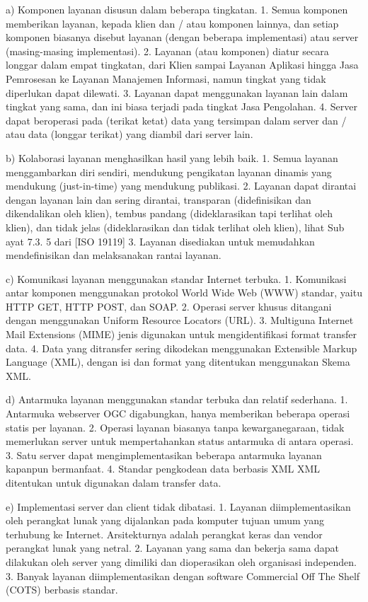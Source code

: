 a) Komponen layanan disusun dalam beberapa tingkatan.
1. Semua komponen memberikan layanan, kepada klien dan / atau komponen lainnya, dan setiap komponen biasanya disebut layanan (dengan beberapa implementasi) atau server (masing-masing implementasi).
2. Layanan (atau komponen) diatur secara longgar dalam empat tingkatan, dari Klien sampai Layanan Aplikasi hingga Jasa Pemrosesan ke Layanan Manajemen Informasi, namun tingkat yang tidak diperlukan dapat dilewati.
3. Layanan dapat menggunakan layanan lain dalam tingkat yang sama, dan ini biasa terjadi pada tingkat Jasa Pengolahan.
4. Server dapat beroperasi pada (terikat ketat) data yang tersimpan dalam server dan / atau data (longgar terikat) yang diambil dari server lain.

b) Kolaborasi layanan menghasilkan hasil yang lebih baik.
1. Semua layanan menggambarkan diri sendiri, mendukung pengikatan layanan dinamis yang mendukung (just-in-time) yang mendukung publikasi.
2. Layanan dapat dirantai dengan layanan lain dan sering dirantai, transparan (didefinisikan dan dikendalikan oleh klien), tembus pandang (dideklarasikan tapi terlihat oleh klien), dan tidak jelas (dideklarasikan dan tidak terlihat oleh klien), lihat Sub ayat 7.3. 5 dari [ISO 19119]
3. Layanan disediakan untuk memudahkan mendefinisikan dan melaksanakan rantai layanan.

c) Komunikasi layanan menggunakan standar Internet terbuka.
1. Komunikasi antar komponen menggunakan protokol World Wide Web (WWW) standar, yaitu HTTP GET, HTTP POST, dan SOAP.
2. Operasi server khusus ditangani dengan menggunakan Uniform Resource Locators (URL).
3. Multiguna Internet Mail Extensions (MIME) jenis digunakan untuk mengidentifikasi format transfer data.
4. Data yang ditransfer sering dikodekan menggunakan Extensible Markup Language (XML), dengan isi dan format yang ditentukan menggunakan Skema XML.

d) Antarmuka layanan menggunakan standar terbuka dan relatif sederhana.
1. Antarmuka webserver OGC digabungkan, hanya memberikan beberapa operasi statis per layanan.
2. Operasi layanan biasanya tanpa kewarganegaraan, tidak memerlukan server untuk mempertahankan status antarmuka di antara operasi.
3. Satu server dapat mengimplementasikan beberapa antarmuka layanan kapanpun bermanfaat.
4. Standar pengkodean data berbasis XML XML ditentukan untuk digunakan dalam transfer data.

e) Implementasi server dan client tidak dibatasi.
1. Layanan diimplementasikan oleh perangkat lunak yang dijalankan pada komputer tujuan umum yang terhubung ke Internet. Arsitekturnya adalah perangkat keras dan vendor perangkat lunak yang netral.
2. Layanan yang sama dan bekerja sama dapat dilakukan oleh server yang dimiliki dan dioperasikan oleh organisasi independen. 
3. Banyak layanan diimplementasikan dengan software Commercial Off The Shelf (COTS) berbasis standar.

